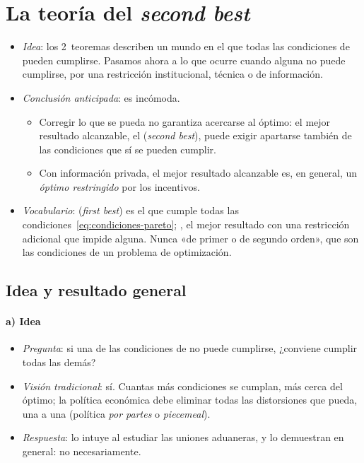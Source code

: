 \documentclass[11pt]{article}
\begin{document}
\section{La teoría del \emph{second best}}\label{sec:second-best}

\begin{itemize}
\item \emph{Idea}: los 2~teoremas describen un mundo en el que todas las condiciones de  pueden cumplirse. Pasamos ahora a lo que ocurre cuando alguna no puede cumplirse, por una restricción institucional, técnica o de información.
\item \emph{Conclusión anticipada}: es incómoda.
  \begin{itemize}
  \item Corregir lo que se pueda no garantiza acercarse al óptimo: el mejor resultado alcanzable, el  (\emph{second best}), puede exigir apartarse también de las condiciones que sí se pueden cumplir.
  \item Con información privada, el mejor resultado alcanzable es, en general, un \emph{óptimo restringido} por los incentivos.
  \end{itemize}
\item \emph{Vocabulario}:  (\emph{first best}) es el que cumple todas las condiciones~\eqref{eq:condiciones-pareto}; , el mejor resultado con una restricción adicional que impide alguna. Nunca «de primer o de segundo orden», que son las condiciones de un problema de optimización.
\end{itemize}

\subsection{Idea y resultado general}\label{sec:second-best-idea}

\paragraph{a) Idea}

\begin{itemize}
\item \emph{Pregunta}: si una de las condiciones de  no puede cumplirse, ¿conviene cumplir todas las demás?
\item \emph{Visión tradicional}: sí. Cuantas más condiciones se cumplan, más cerca del óptimo; la política económica debe eliminar todas las distorsiones que pueda, una a una (política \emph{por partes} o \emph{piecemeal}).
\item \emph{Respuesta}: \textcite{Meade1955Trade} lo intuye al estudiar las uniones aduaneras, y \textcite{LipseyLancaster1956General} lo demuestran en general: no necesariamente.
\end{itemize}
\end{document}
